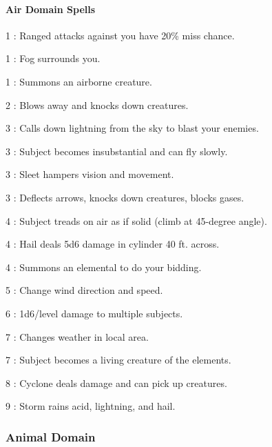 \paragraph{Air Domain Spells}
\begin{list}{}{\leftmargin=1em}
\item[1] : Ranged attacks against you have 20\% miss chance.
\item[1] : Fog surrounds you.
\item[1] : Summons an airborne creature.
\item[2] : Blows away and knocks down creatures.
\item[3] : Calls down lightning from the sky to blast your enemies.
\item[3] : Subject becomes insubstantial and can fly slowly.
\item[3] : Sleet hampers vision and movement.
\item[3] : Deflects arrows, knocks down creatures, blocks gases.
\item[4] : Subject treads on air as if solid (climb at 45-degree angle).
\item[4] : Hail deals 5d6 damage in cylinder 40 ft. across.
\item[4] : Summons an elemental to do your bidding.
\item[5] : Change wind direction and speed.
\item[6] : 1d6/level damage to multiple subjects.
\item[7] : Changes weather in local area.
\item[7] : Subject becomes a living creature of the elements.
\item[8] : Cyclone deals damage and can pick up creatures.
\item[9] : Storm rains acid, lightning, and hail.
\end{list}
\subsubsection{Animal Domain}
\label{Domain:Animal}
